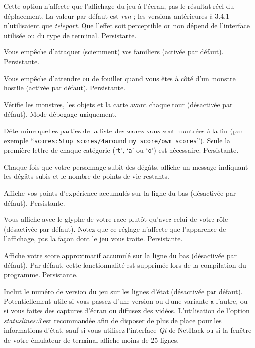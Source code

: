 \documentclass[titlepage]{article}
\begin{document}
\begin{description}[font=\mdseries\itshape]
Cette option n'affecte que l'affichage du jeu à l'écran, pas le
résultat réel du déplacement. La valeur par défaut est \textit{run} ; les versions antérieures à 3.4.1
n'utilisaient que \textit{teleport}. Que l'effet soit perceptible ou non
dépend de l'interface utilisée ou du type de terminal. Persistante.
\item[safe\textunderscore pet]
Vous empêche d'attaquer (sciemment) vos familiers (activée par défaut). Persistante.
\item[safe\textunderscore wait]
Vous empêche d'attendre ou de fouiller quand vous êtes à côté d'un monstre hostile
(activée par défaut). Persistante.
\item[sanity\textunderscore check]
Vérifie les monstres, les objets et la carte avant chaque tour (désactivée par défaut).
Mode débogage uniquement.
\item[scores]
Détermine quelles parties de la liste des scores vous sont montrées à la fin (par exemple
``\texttt{scores:5top scores/4around my score/own scores}''). Seule la première
lettre de chaque catégorie (`\texttt{t}', `\texttt{a}' ou `\texttt{o}') est nécessaire.
Persistante.
\item[showdamage]
Chaque fois que votre personnage subit des dégâts, affiche un message indiquant les dégâts subis
et le nombre de points de vie restants.
\item[showexp]
Affiche vos points d'expérience accumulés sur la ligne du bas (désactivée par défaut).
Persistante.
\item[showrace]
Vous affiche avec le glyphe de votre race plutôt qu'avec celui
de votre rôle (désactivée par défaut). Notez que ce réglage n'affecte que
l'apparence de l'affichage, pas la façon dont le jeu vous traite.
Persistante.
\item[showscore]
Affiche votre score approximatif accumulé sur la ligne du bas (désactivée par défaut).
Par défaut, cette fonctionnalité est supprimée lors de la compilation du programme.
Persistante.
\item[showvers]
Inclut le numéro de version du jeu sur les lignes d'état (désactivée par défaut).
Potentiellement utile si vous passez d'une version ou d'une variante à l'autre,
ou si vous faites des captures d'écran ou diffusez des vidéos.
L'utilisation de l'option
\textit{statuslines:3}
est recommandée afin de disposer de plus de place pour les
informations d'état, sauf si vous utilisez l'interface \textit{Qt} de NetHack
ou si la fenêtre de votre émulateur de terminal affiche moins de 25 lignes.

\end{description}
\end{document}
